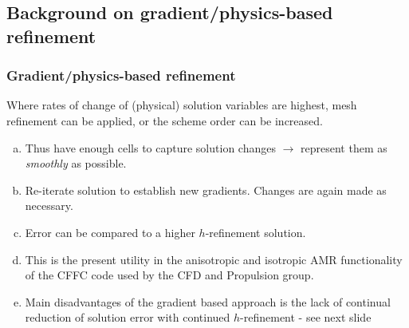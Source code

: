 \documentclass{beamer}
\begin{document}
\subsection[Gradient]{Background on gradient/physics-based refinement}
\begin{frame}%
\scriptsize
\frametitle{Gradient/physics-based refinement}
Where rates of change of (physical) solution variables are highest, mesh refinement can be applied, or the scheme order can be increased.

\begin{enumerate}[(a)]
\item Thus have enough cells to capture solution changes $\rightarrow$ represent them as \textit{smoothly} as possible.
\item Re-iterate solution to establish new gradients. Changes are again made as necessary. 
\item Error can be compared to a higher $h$-refinement solution.
\item This is the present utility in the anisotropic and isotropic AMR functionality of the CFFC code used by the CFD and Propulsion group.
\item Main disadvantages of the gradient based approach is the lack of continual reduction of solution error with continued $h$-refinement - see next slide
\end{enumerate}
\end{frame}

\end{document}
